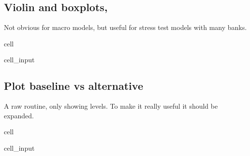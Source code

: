 \documentclass[letterpaper,10pt,english]{jupyterBook}
\begin{document}
\subsection{Violin and boxplots,}
\label{\detokenize{content/notebooks/modelflow_features:violin-and-boxplots}}
\sphinxAtStartPar
Not obvious for macro models, but useful for stress test  models with many banks.

\begin{sphinxuseclass}{cell}\begin{sphinxVerbatimInput}

\begin{sphinxuseclass}{cell_input}
\begin{sphinxVerbatim}[commandchars=\\\{\}]
  
    \PYG{p}{[}\PYG{p}{]}  
    \PYG{p}{[}\PYG{p}{]}  
\end{sphinxVerbatim}

\end{sphinxuseclass}\end{sphinxVerbatimInput}

\end{sphinxuseclass}

\subsection{Plot baseline vs alternative}
\label{\detokenize{content/notebooks/modelflow_features:plot-baseline-vs-alternative}}
\sphinxAtStartPar
A raw routine, only showing levels.
To make it really useful it should be expanded.

\begin{sphinxuseclass}{cell}\begin{sphinxVerbatimInput}

\begin{sphinxuseclass}{cell_input}
\begin{sphinxVerbatim}[commandchars=\\\{\}]
\PYG{p}{[}\PYG{p}{]} 
\end{sphinxVerbatim}

\end{sphinxuseclass}\end{sphinxVerbatimInput}

\end{sphinxuseclass}
\end{document}
